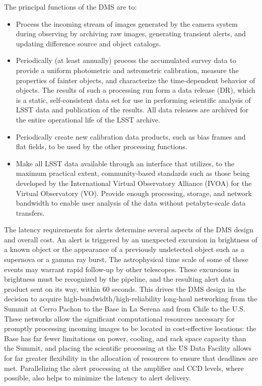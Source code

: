 \documentclass[DM,toc,lsstdraft]{lsstdoc}
\begin{document}
The principal functions of the DMS are to:
\begin{itemize}
	\item Process the incoming stream of images generated by the camera system during observing by archiving raw images, generating transient alerts, and updating difference source and object catalogs.
	\item Periodically (at least annually) process the accumulated survey data to provide a uniform photometric and astrometric calibration, measure the properties of fainter objects, and characterize the time-dependent behavior of objects. The results of such a processing run form a data release (DR), which is a static, self-consistent data set for use in performing scientific analysis of LSST data and publication of the results. All data releases are archived for the entire operational life of the LSST archive.
	\item Periodically create new calibration data products, such as bias frames and flat fields, to be used by the other processing functions.
	\item Make all LSST data available through an interface that utilizes, to the maximum practical extent, community-based standards such as those being developed by the International Virtual Observatory Alliance (IVOA) for the Virtual Observatory (VO).  Provide enough processing, storage, and network bandwidth to enable user analysis of the data without petabyte-scale data transfers.
\end{itemize}

The latency requirements for alerts determine several aspects of the DMS design
and overall cost.  An alert is triggered by an unexpected excursion in
brightness of a known object or the appearance of a previously undetected
object such as a supernova or a gamma ray burst. The astrophysical time scale of some of
these events may warrant rapid follow-up by other telescopes.
These excursions in brightness must be recognized by the pipeline, and the
resulting alert data product sent on its way, within 60 seconds. This drives
the DMS design in the decision to acquire high-bandwidth/high-reliability
long-haul networking from the Summit at Cerro Pachon to the Base in La Serena and from Chile to the U.S. These networks allow the significant computational
resources necessary for promptly processing incoming images to be located in
cost-effective locations: the Base has far fewer limitations on power, cooling,
and rack space capacity than the Summit, and placing the scientific
processing at the US Data Facility allows for far greater flexibility in the allocation of
resources to ensure that deadlines are met.
Parallelizing the alert
processing at the amplifier and CCD levels, where possible, also helps to
minimize the latency to alert delivery.
\end{document}
